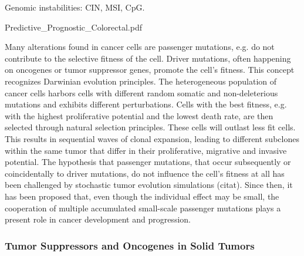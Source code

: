       Genomic instabilities: CIN, MSI, CpG.

Predictive_Prognostic_Colorectal.pdf

      Many alterations found in cancer cells are passenger mutations, e.g. do not
      contribute to the selective fitness of the cell. Driver mutations, often
      happening on oncogenes or tumor suppressor genes, promote the cell's
      fitness. This concept recognizes Darwinian evolution principles. The
      heterogeneous  population of cancer cells harbors cells with different
      random somatic and non-deleterious mutations and exhibits different
      perturbations. Cells with the best fitness, e.g. with the highest
      proliferative potential  and the lowest death rate, are then selected
      through natural selection principles. These cells will outlast less fit
      cells. This results in  sequential waves of clonal expansion, leading to
      different subclones within the same tumor that differ in their
      proliferative, migrative and invasive potential. The hypothesis that
      passenger mutations, that occur subsequently or coincidentally to driver
      mutations, do not influence the cell's fitness at all has been
      challenged by stochastic tumor evolution simulations (citat). Since then,
      it has been proposed that, even though the individual effect may be
      small, the cooperation of multiple accumulated small-scale passenger
      mutations plays a present role in cancer development and progression.

    \subsubsection{Tumor Suppressors and Oncogenes in Solid Tumors}

